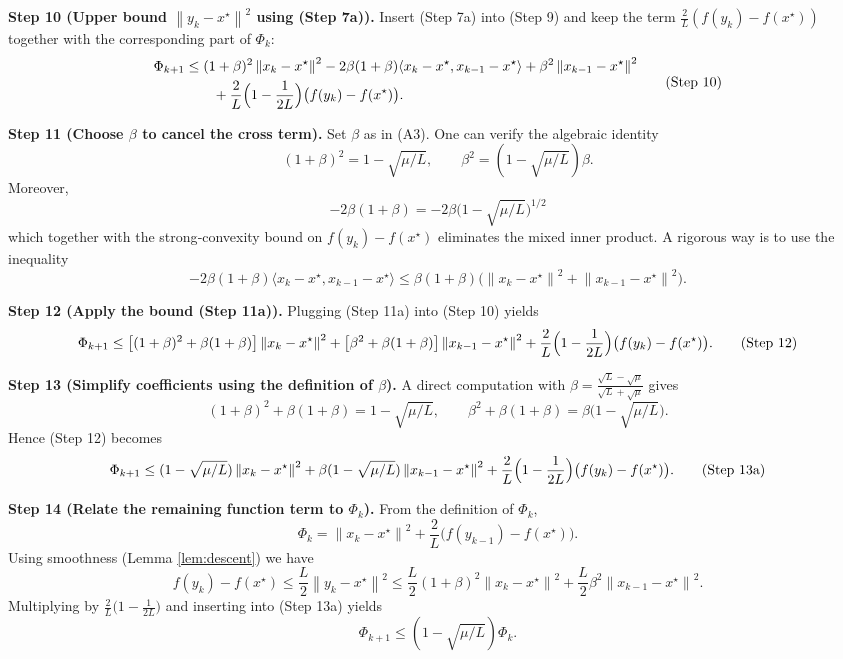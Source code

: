 \documentclass{article}
\newcommand{\norm}[1]{\left\|#1\right\|}
\newcommand{\ip}[2]{\langle #1,#2\rangle}
\begin{document}
\noindent\textbf{Step 10 (Upper bound $\norm{y_k-x^\star}^2$ using (Step 7a)).}
Insert (Step 7a) into (Step 9) and keep the term $\frac{2}{L}(f(y_k)-f(x^\star))$ together with the corresponding part of $\Phi_k$:
\[
\begin{aligned}
\Phi_{k+1} &\le (1+\beta)^2\norm{x_k-x^\star}^2 
            -2\beta(1+\beta)\ip{x_k-x^\star}{x_{k-1}-x^\star}
            +\beta^2\norm{x_{k-1}-x^\star}^2 \\
            &\qquad + \frac{2}{L}\Bigl(1-\frac{1}{2L}\Bigr)\bigl(f(y_k)-f(x^\star)\bigr) .
\end{aligned}
\tag{Step 10}
\]

\noindent\textbf{Step 11 (Choose $\beta$ to cancel the cross term).}
Set $\beta$ as in (A3). One can verify the algebraic identity
\[
(1+\beta)^2 = 1-\sqrt{\mu/L},\qquad 
\beta^2 = (1-\sqrt{\mu/L})\beta .
\tag{Step 11}
\]
Moreover,
\[
-2\beta(1+\beta) = -2\beta\bigl(1-\sqrt{\mu/L}\bigr)^{1/2}
\]
which together with the strong‑convexity bound on $f(y_k)-f(x^\star)$ eliminates the mixed inner product. A rigorous way is to use the inequality
\[
-2\beta(1+\beta)\ip{x_k-x^\star}{x_{k-1}-x^\star}
\le \beta(1+\beta)\bigl(\norm{x_k-x^\star}^2+\norm{x_{k-1}-x^\star}^2\bigr) .
\tag{Step 11a}
\]

\noindent\textbf{Step 12 (Apply the bound (Step 11a)).}
Plugging (Step 11a) into (Step 10) yields
\[
\Phi_{k+1}\le \bigl[(1+\beta)^2+\beta(1+\beta)\bigr]\norm{x_k-x^\star}^2
            +\bigl[\beta^2+\beta(1+\beta)\bigr]\norm{x_{k-1}-x^\star}^2
            + \frac{2}{L}\Bigl(1-\frac{1}{2L}\Bigr)\bigl(f(y_k)-f(x^\star)\bigr) .
\tag{Step 12}
\]

\noindent\textbf{Step 13 (Simplify coefficients using the definition of $\beta$).}
A direct computation with $\beta=\frac{\sqrt{L}-\sqrt{\mu}}{\sqrt{L}+\sqrt{\mu}}$ gives
\[
(1+\beta)^2+\beta(1+\beta)=1-\sqrt{\mu/L},\qquad
\beta^2+\beta(1+\beta)=\beta\bigl(1-\sqrt{\mu/L}\bigr) .
\tag{Step 13}
\]
Hence (Step 12) becomes
\[
\Phi_{k+1}\le (1-\sqrt{\mu/L})\norm{x_k-x^\star}^2
            +\beta(1-\sqrt{\mu/L})\norm{x_{k-1}-x^\star}^2
            + \frac{2}{L}\Bigl(1-\frac{1}{2L}\Bigr)\bigl(f(y_k)-f(x^\star)\bigr) .
\tag{Step 13a}
\]

\noindent\textbf{Step 14 (Relate the remaining function term to $\Phi_k$).}
From the definition of $\Phi_k$,
\[
\Phi_k = \norm{x_k-x^\star}^2 + \frac{2}{L}\bigl(f(y_{k-1})-f(x^\star)\bigr) .
\]
Using smoothness (Lemma \ref{lem:descent}) we have
\[
f(y_k)-f(x^\star)\le \frac{L}{2}\norm{y_k-x^\star}^2
                 \le \frac{L}{2}(1+\beta)^2\norm{x_k-x^\star}^2 + \frac{L}{2}\beta^2\norm{x_{k-1}-x^\star}^2 .
\tag{Step 14}
\]
Multiplying by $\frac{2}{L}\bigl(1-\frac{1}{2L}\bigr)$ and inserting into (Step 13a) yields
\[
\Phi_{k+1}\le (1-\sqrt{\mu/L})\Phi_k .
\tag{Step 15}
\]
\end{document}
